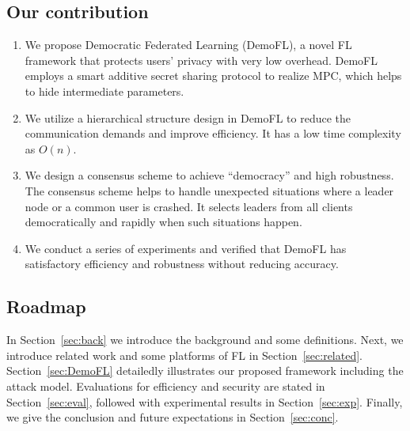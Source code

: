 \subsection{Our contribution}
\begin{enumerate}
    \item We propose Democratic Federated Learning (DemoFL), a novel FL framework that protects users' privacy with very low overhead. DemoFL employs a smart additive secret sharing protocol to realize MPC, which helps to hide intermediate parameters.

    \item We utilize a hierarchical structure design in DemoFL to reduce the communication demands and improve efficiency. It has a low time complexity as $O(n)$.

    \item We design a consensus scheme to achieve ``democracy'' and high robustness. The consensus scheme helps to handle unexpected situations where a leader node or a common user is crashed. It selects leaders from all clients democratically and rapidly when such situations happen.

    \item We conduct a series of experiments and verified that DemoFL has satisfactory efficiency and robustness without reducing accuracy.

\end{enumerate}

\subsection{Roadmap} In Section~\ref{sec:back} we introduce the background and some definitions. Next, we introduce related work and some platforms of FL in Section~\ref{sec:related}. Section~\ref{sec:DemoFL} detailedly illustrates our proposed framework including the attack model. Evaluations for efficiency and security are stated in Section~\ref{sec:eval}, followed with experimental results in Section~\ref{sec:exp}. Finally, we give the conclusion and future expectations in Section~\ref{sec:conc}.